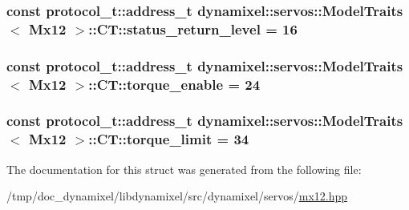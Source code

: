 \subsubsection[{\texorpdfstring{status\+\_\+return\+\_\+level}{status_return_level}}]{\setlength{\rightskip}{0pt plus 5cm}const {\bf protocol\+\_\+t\+::address\+\_\+t} {\bf dynamixel\+::servos\+::\+Model\+Traits}$<$ {\bf Mx12} $>$\+::C\+T\+::status\+\_\+return\+\_\+level = 16\hspace{0.3cm}{\ttfamily [static]}}\hypertarget{structdynamixel_1_1servos_1_1_model_traits_3_01_mx12_01_4_1_1_c_t_a8111ed7bce55764840193fd6b63e10fe}{}\label{structdynamixel_1_1servos_1_1_model_traits_3_01_mx12_01_4_1_1_c_t_a8111ed7bce55764840193fd6b63e10fe}
\subsubsection[{\texorpdfstring{torque\+\_\+enable}{torque_enable}}]{\setlength{\rightskip}{0pt plus 5cm}const {\bf protocol\+\_\+t\+::address\+\_\+t} {\bf dynamixel\+::servos\+::\+Model\+Traits}$<$ {\bf Mx12} $>$\+::C\+T\+::torque\+\_\+enable = 24\hspace{0.3cm}{\ttfamily [static]}}\hypertarget{structdynamixel_1_1servos_1_1_model_traits_3_01_mx12_01_4_1_1_c_t_af48b8e9e1a7663f32b8b4f44d8612796}{}\label{structdynamixel_1_1servos_1_1_model_traits_3_01_mx12_01_4_1_1_c_t_af48b8e9e1a7663f32b8b4f44d8612796}
\subsubsection[{\texorpdfstring{torque\+\_\+limit}{torque_limit}}]{\setlength{\rightskip}{0pt plus 5cm}const {\bf protocol\+\_\+t\+::address\+\_\+t} {\bf dynamixel\+::servos\+::\+Model\+Traits}$<$ {\bf Mx12} $>$\+::C\+T\+::torque\+\_\+limit = 34\hspace{0.3cm}{\ttfamily [static]}}\hypertarget{structdynamixel_1_1servos_1_1_model_traits_3_01_mx12_01_4_1_1_c_t_a59de18c11d95eb1a547adbafd535d0f7}{}\label{structdynamixel_1_1servos_1_1_model_traits_3_01_mx12_01_4_1_1_c_t_a59de18c11d95eb1a547adbafd535d0f7}


The documentation for this struct was generated from the following file\+:\begin{DoxyCompactItemize}
\item 
/tmp/doc\+\_\+dynamixel/libdynamixel/src/dynamixel/servos/\hyperlink{mx12_8hpp}{mx12.\+hpp}\end{DoxyCompactItemize}
